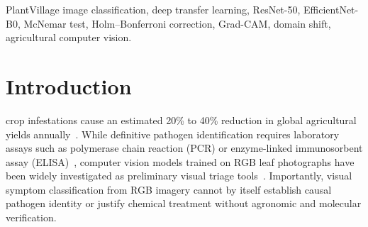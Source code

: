 \documentclass[journal]{IEEEtran}
\begin{document}
\begin{IEEEkeywords}
PlantVillage image classification, deep transfer learning, ResNet-50, EfficientNet-B0, McNemar test, Holm--Bonferroni correction, Grad-CAM, domain shift, agricultural computer vision.
\end{IEEEkeywords}

\section{Introduction}
 crop infestations cause an estimated 20\% to 40\% reduction in global agricultural yields annually~\cite{hughes2015, mohanty2016, savary2019}. While definitive pathogen identification requires laboratory assays such as polymerase chain reaction (PCR) or enzyme-linked immunosorbent assay (ELISA)~\cite{martin2000, sankaran2010}, computer vision models trained on RGB leaf photographs have been widely investigated as preliminary visual triage tools~\cite{barbedo2013, ferentinos2018}. Importantly, visual symptom classification from RGB imagery cannot by itself establish causal pathogen identity or justify chemical treatment without agronomic and molecular verification.
\end{document}
